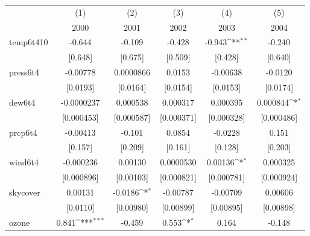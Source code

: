 {
\def\sym#1{\ifmmode^{#1}\else\(^{#1}\)\fi}
\begin{tabular}{l*{5}{c}}
\hline\hline
            &\multicolumn{1}{c}{(1)}&\multicolumn{1}{c}{(2)}&\multicolumn{1}{c}{(3)}&\multicolumn{1}{c}{(4)}&\multicolumn{1}{c}{(5)}\\
            &\multicolumn{1}{c}{2000}&\multicolumn{1}{c}{2001}&\multicolumn{1}{c}{2002}&\multicolumn{1}{c}{2003}&\multicolumn{1}{c}{2004}\\
\hline
temp6t410   &      -0.644         &      -0.109         &      -0.428         &      -0.943\sym{**} &      -0.240         \\
            &     [0.648]         &     [0.675]         &     [0.509]         &     [0.428]         &     [0.640]         \\
[1em]
press6t4    &    -0.00778         &   0.0000866         &      0.0153         &    -0.00638         &     -0.0120         \\
            &    [0.0193]         &    [0.0164]         &    [0.0154]         &    [0.0153]         &    [0.0174]         \\
[1em]
dew6t4      &  -0.0000237         &    0.000538         &    0.000317         &    0.000395         &    0.000844\sym{*}  \\
            &  [0.000453]         &  [0.000587]         &  [0.000371]         &  [0.000328]         &  [0.000486]         \\
[1em]
prcp6t4     &    -0.00413         &      -0.101         &      0.0854         &     -0.0228         &       0.151         \\
            &     [0.157]         &     [0.209]         &     [0.161]         &     [0.128]         &     [0.203]         \\
[1em]
wind6t4     &   -0.000236         &     0.00130         &   0.0000530         &     0.00136\sym{*}  &    0.000325         \\
            &  [0.000896]         &   [0.00103]         &  [0.000821]         &  [0.000781]         &  [0.000924]         \\
[1em]
skycover    &     0.00131         &     -0.0186\sym{*}  &    -0.00787         &    -0.00709         &     0.00606         \\
            &    [0.0110]         &   [0.00980]         &   [0.00899]         &   [0.00895]         &   [0.00898]         \\
[1em]
ozone       &       0.841\sym{***}&      -0.459         &       0.553\sym{*}  &       0.164         &      -0.148         \\

\end{tabular}}
